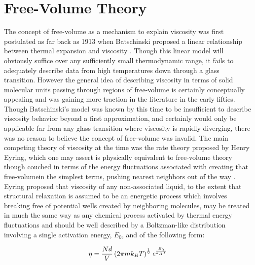 \section{Free-Volume Theory}\label{sec:freeVolume}

The concept of free-volume as a mechanism to explain viscosity was first postulated as far back as 1913 when Batschinski proposed a linear relationship between thermal expansion and viscosity \nolinebreak\cite{Batschinski}. Though this linear model will obviously suffice over any sufficiently small thermodynamic range, it fails to adequately describe data from high temperatures down through a glass transition.  However the general idea of describing viscosity in terms of solid molecular units passing through regions of free-volume is certainly conceptually appealing and was gaining more traction in the literature in the early fifties.  Though Batschinski's model was known by this time to be insufficient to describe viscosity behavior beyond a first approximation, and certainly would only be applicable far from any glass transition where viscosity is rapidly diverging, there was no reason to believe the concept of free-volume was invalid.  The main competing theory of viscosity at the time was the rate theory proposed by Henry Eyring, which one may assert is physically equivalent to free-volume theory though couched in terms of the energy fluctuations associated with creating that free-volume\textemdash in the simplest terms, pushing nearest neighbors out of the way \nolinebreak\cite{Eyring}.  Eyring proposed that viscosity of any non-associated liquid, to the extent that structural relaxation is assumed to be an energetic process which involves breaking free of potential wells created by neighboring molecules, may be treated in much the same way as any chemical process activated by thermal energy fluctuations and should be well described by a Boltzman-like distribution involving a single activation energy, $E_0$, and of the following form:

\begin{equation}
	\eta=\frac{Nd}{V}\left(2\pi m k_B T\right)^{\frac{1}{2}}\textit{e}^{\frac{E_0}{k_B T}}
	\label{eqn:Eyring}
\end{equation} 

